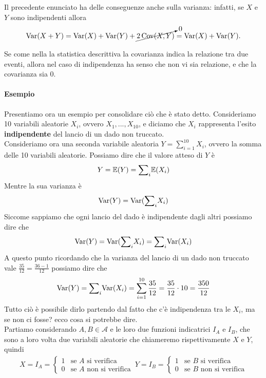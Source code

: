 \noindent Il precedente enunciato ha delle conseguenze anche sulla varianza: infatti, se $X$ e $Y$ sono indipendenti allora \[
\operatorname{Var}(X + Y) = \operatorname{Var}(X) + \operatorname{Var}(Y) + \cancelto{0}{2\operatorname{Cov}(X,Y)} = \operatorname{Var}(X) + \operatorname{Var}(Y).
\]

\noindent Se come nella la statistica descrittiva la covarianza indica la relazione tra due eventi, allora nel caso di indipendenza ha senso che non vi sia relazione, e che la covarianza sia 0. \\

\paragraph{\textbf{Esempio}}
Presentiamo ora un esempio per consolidare ciò che è stato detto. Consideriamo 10 variabili aleatorie $X_i$, ovvero $X_1, ..., X_{10}$, e diciamo che $X_i$ rappresenta l'esito \textbf{indipendente} del lancio di un dado non truccato. \\
Consideriamo ora una seconda variabile aleatoria $Y = \sum_{i=1}^{10} X_i$, ovvero la somma delle 10 variabili aleatorie. Possiamo dire che il valore atteso di $Y$ è $$Y = \mathbb{E}(Y) = {\sum}_i{\mathbb{E}(X_i)}$$ Mentre la sua varianza è $$\operatorname{Var}(Y) = \operatorname{Var}({\sum}_i{X_i})$$ Siccome sappiamo che ogni lancio del dado è indipendente dagli altri possiamo dire che $$\operatorname{Var}(Y) = \operatorname{Var}({\sum}_i{X_i}) = {\sum}_i{\operatorname{Var}(X_i)}$$
A questo punto ricordando che la varianza del lancio di un dado non truccato vale $\frac{35}{12} = \frac{36 - 1}{12}$ possiamo dire che $$\operatorname{Var}(Y) = {\sum}_i{\operatorname{Var}(X_i)} = \sum_{i=1}^{10} \frac{35}{12} = \frac{35}{12} \cdot 10 = \frac{350}{12}$$
Tutto ciò è possibile dirlo partendo dal fatto che c'è indipendenza tra le $X_i$, ma se non ci fosse? ecco cosa si potrebbe dire. \\
Partiamo considerando $A, B \in \mathcal{A}$ e le loro due funzioni indicatrici $I_A \text{ e } I_B$, che sono a loro volta due variabili aleatorie che chiameremo rispettivamente $X \text{ e } Y$, quindi \[
\begin{array}{c}
X = I_A = \begin{cases}
    1 & \text{se $A$ si verifica} \\
    0 & \text{se $A$ non si verifica}
\end{cases} \,

Y = I_B = \begin{cases}
    1 & \text{se $B$ si verifica} \\
    0 & \text{se $B$ non si verifica}
\end{cases}
\end{array}
\]
